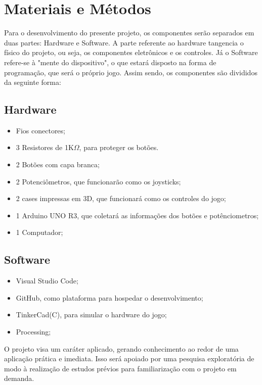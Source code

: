 \section{Materiais e Métodos}

Para o desenvolvimento do presente projeto, os componentes serão separados em duas partes: Hardware e Software.
	A parte referente ao hardware tangencia o físico do projeto, ou seja, os componentes eletrônicos e os controles. Já o Software refere-se à "mente do dispositivo", o que estará disposto na forma de programação, que será o próprio jogo. Assim sendo, os componentes são divididos da seguinte forma:
	
\subsection{Hardware}
\begin{itemize}
\item Fios conectores;
\item 3 Resistores de 1K$\Omega$, para proteger os botões. 
\item 2 Botões com capa branca;
\item 2 Potenciômetros, que funcionarão como os joysticks;
\item 2 cases impressas em 3D, que funcionará como os controles do jogo;
\item 1 Arduino UNO R3, que coletará as informações dos botões e potênciometros;
\item 1 Computador; \vspace*{0.5cm}
\end{itemize}

\subsection{Software}
\begin{itemize}
\item Visual Studio Code;
\item GitHub, como plataforma para hospedar o desenvolvimento;
\item TinkerCad(C), para simular o hardware do jogo;
\item Processing; 
\end{itemize}

	O projeto visa um caráter aplicado, gerando conhecimento ao redor de uma aplicação prática e imediata. Isso será apoiado por uma pesquisa exploratória de modo à realização de estudos prévios para familiarização com o projeto em demanda.
	
